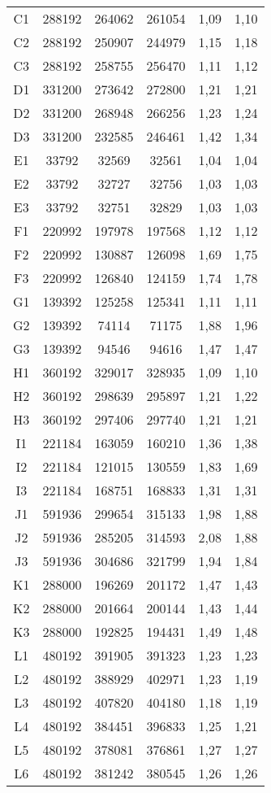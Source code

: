 \begin{center}
\begin{longtable}{cccccc}
    C1    & 288192 & 264062 & 261054 & 1,09  & 1,10 \\
    C2    & 288192 & 250907 & 244979 & 1,15  & 1,18 \\
    C3    & 288192 & 258755 & 256470 & 1,11  & 1,12 \\
    D1    & 331200 & 273642 & 272800 & 1,21  & 1,21 \\
    D2    & 331200 & 268948 & 266256 & 1,23  & 1,24 \\
    D3    & 331200 & 232585 & 246461 & 1,42  & 1,34 \\
    E1    & 33792 & 32569 & 32561 & 1,04  & 1,04 \\
    E2    & 33792 & 32727 & 32756 & 1,03  & 1,03 \\
    E3    & 33792 & 32751 & 32829 & 1,03  & 1,03 \\
    F1    & 220992 & 197978 & 197568 & 1,12  & 1,12 \\
    F2    & 220992 & 130887 & 126098 & 1,69  & 1,75 \\
    F3    & 220992 & 126840 & 124159 & 1,74  & 1,78 \\
    G1    & 139392 & 125258 & 125341 & 1,11  & 1,11 \\
    G2    & 139392 & 74114 & 71175 & 1,88  & 1,96 \\
    G3    & 139392 & 94546 & 94616 & 1,47  & 1,47 \\
    H1    & 360192 & 329017 & 328935 & 1,09  & 1,10 \\
    H2    & 360192 & 298639 & 295897 & 1,21  & 1,22 \\
    H3    & 360192 & 297406 & 297740 & 1,21  & 1,21 \\
    I1    & 221184 & 163059 & 160210 & 1,36  & 1,38 \\
    I2    & 221184 & 121015 & 130559 & 1,83  & 1,69 \\
    I3    & 221184 & 168751 & 168833 & 1,31  & 1,31 \\
    J1    & 591936 & 299654 & 315133 & 1,98  & 1,88 \\
    J2    & 591936 & 285205 & 314593 & 2,08  & 1,88 \\
    J3    & 591936 & 304686 & 321799 & 1,94  & 1,84 \\
    K1    & 288000 & 196269 & 201172 & 1,47  & 1,43 \\
    K2    & 288000 & 201664 & 200144 & 1,43  & 1,44 \\
    K3    & 288000 & 192825 & 194431 & 1,49  & 1,48 \\
    L1    & 480192 & 391905 & 391323 & 1,23  & 1,23 \\
    L2    & 480192 & 388929 & 402971 & 1,23  & 1,19 \\
    L3    & 480192 & 407820 & 404180 & 1,18  & 1,19 \\
    L4    & 480192 & 384451 & 396833 & 1,25  & 1,21 \\
    L5    & 480192 & 378081 & 376861 & 1,27  & 1,27 \\
    L6    & 480192 & 381242 & 380545 & 1,26  & 1,26 \\
\end{longtable}
\end{center}

